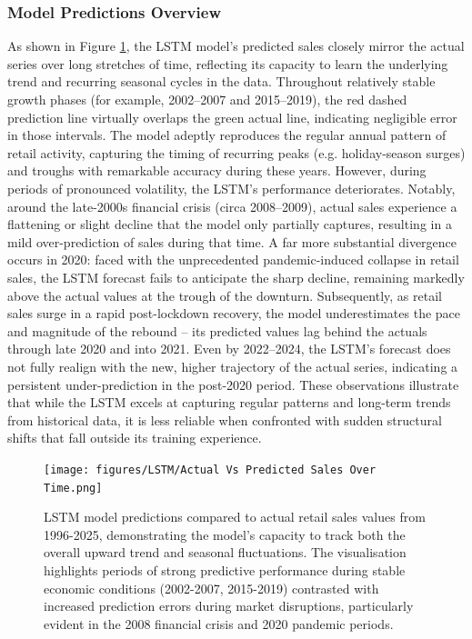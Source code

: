 \documentclass[12pt,a4paper]{report}
\begin{document}
\subsubsection{Model Predictions Overview}
As shown in Figure \ref{fig:lstm_forecast}, the LSTM model's predicted sales closely mirror the actual series over long stretches of time, reflecting its capacity to learn the underlying trend and recurring seasonal cycles in the data. Throughout relatively stable growth phases (for example, 2002–2007 and 2015–2019), the red dashed prediction line virtually overlaps the green actual line, indicating negligible error in those intervals. The model adeptly reproduces the regular annual pattern of retail activity, capturing the timing of recurring peaks (e.g. holiday-season surges) and troughs with remarkable accuracy during these years. However, during periods of pronounced volatility, the LSTM's performance deteriorates. Notably, around the late-2000s financial crisis (circa 2008–2009), actual sales experience a flattening or slight decline that the model only partially captures, resulting in a mild over-prediction of sales during that time. A far more substantial divergence occurs in 2020: faced with the unprecedented pandemic-induced collapse in retail sales, the LSTM forecast fails to anticipate the sharp decline, remaining markedly above the actual values at the trough of the downturn. Subsequently, as retail sales surge in a rapid post-lockdown recovery, the model underestimates the pace and magnitude of the rebound – its predicted values lag behind the actuals through late 2020 and into 2021. Even by 2022–2024, the LSTM's forecast does not fully realign with the new, higher trajectory of the actual series, indicating a persistent under-prediction in the post-2020 period. These observations illustrate that while the LSTM excels at capturing regular patterns and long-term trends from historical data, it is less reliable when confronted with sudden structural shifts that fall outside its training experience.

\begin{figure}[htbp]
\centering
\texttt{[image: figures/LSTM/Actual Vs Predicted Sales Over Time.png]}
\caption{LSTM model predictions compared to actual retail sales values from 1996-2025, demonstrating the model's capacity to track both the overall upward trend and seasonal fluctuations. The visualisation highlights periods of strong predictive performance during stable economic conditions (2002-2007, 2015-2019) contrasted with increased prediction errors during market disruptions, particularly evident in the 2008 financial crisis and 2020 pandemic periods.}
\label{fig:lstm_forecast}
\end{figure}
\end{document}
